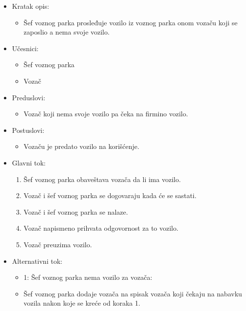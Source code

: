 \begin{itemize}
	\item Kratak opis:
		\begin{itemize}
			\item Šef voznog parka prosleđuje vozilo iz voznog parka onom vozaču koji se zaposlio a nema svoje vozilo.
		\end{itemize}

	\item Učesnici:
		\begin{itemize}
		    \item Šef voznog parka
			\item Vozač
		\end{itemize}


	\item Preduslovi:
		\begin{itemize}
		    \item Vozač koji nema svoje vozilo pa čeka na firmino vozilo.
		\end{itemize}


	\item Postuslovi:
		\begin{itemize}
			\item Vozaču je predato vozilo na korišćenje.
	\end{itemize}

	\item Glavni tok:
		\begin{enumerate}
		    \item Šef voznog parka obaveštava vozača da li ima vozilo.
		    \item Vozač i šef voznog parka se dogovaraju kada će se sastati.
		    \item Vozač i šef voznog parka se nalaze.
			\item Vozač napismeno prihvata odgovornost za to vozilo.
			\item Vozač preuzima vozilo.
		\end{enumerate}

	\item Alternativni tok:
		\begin{itemize}
		    \item 1: Šef voznog parka nema vozilo za vozača:
			\item Šef voznog parka dodaje vozača na spisak vozača koji čekaju na nabavku vozila nakon koje se kreće od koraka 1.
		\end{itemize}

\end{itemize}
	
